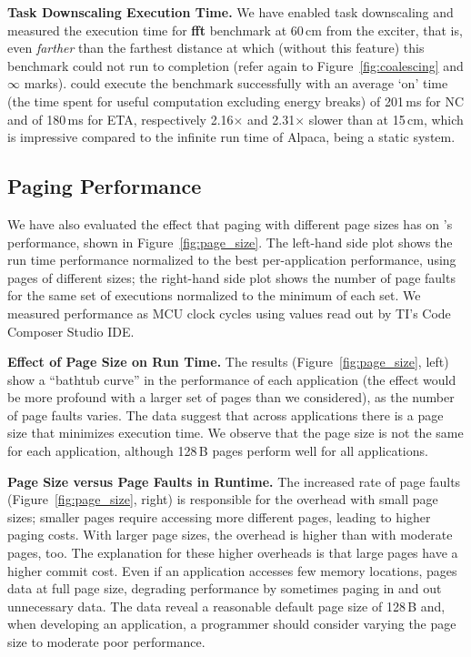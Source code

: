 \textbf{Task Downscaling Execution Time.} We have enabled task downscaling and measured the execution time for \textbf{fft} benchmark at 60\,cm from the exciter, that is, even \emph{farther} than the farthest distance at which (without this feature) this benchmark could not run to completion (refer again to Figure~\ref{fig:coalescing} and $\infty$ marks). \sys could execute the benchmark successfully with an average `on' time (the time spent for useful computation excluding energy breaks) of 201\,ms for NC and of 180\,ms for ETA, respectively 2.16$\times$ and 2.31$\times$ slower than at 15\,cm, which is impressive compared to the infinite run time of Alpaca, being a static system.

\subsection{Paging Performance}
\label{sec:results_memory_management}

We have also evaluated the effect that paging with different page sizes has on \sys's performance, shown in Figure~\ref{fig:page_size}. The left-hand side plot shows the run time performance normalized to the best per-application performance, using pages of different sizes; the right-hand side plot shows the number of page faults for the same set of executions normalized to the minimum of each set. We measured performance as MCU clock cycles using values read out by TI's Code Composer Studio IDE. 

\textbf{Effect of Page Size on Run Time.} The results (Figure~\ref{fig:page_size}, left) show a ``bathtub curve'' in the performance of each application (the effect would be more profound with a larger set of pages than we considered), as the number of page faults varies. The data suggest that across applications there is a page size that minimizes execution time. We observe that the page size is not the same for each application, although 128\,B pages perform well for all applications. 

\textbf{Page Size versus Page Faults in \sys Runtime.} The increased rate of page faults (Figure~\ref{fig:page_size}, right) is responsible for the overhead with small page sizes; smaller pages require accessing more different pages, leading to higher paging costs. With larger page sizes, the overhead is higher than with moderate pages, too. The explanation for these higher overheads is that large pages have a higher commit cost. Even if an application accesses few memory locations, \sys pages data at full page size, degrading performance by sometimes paging in and out unnecessary data. The data reveal a reasonable default page size of 128\,B and, when developing an application, a programmer should consider varying the page size to moderate poor performance.

